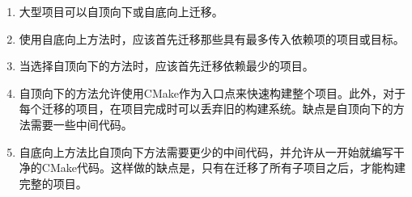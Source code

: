 

\begin{enumerate}
\item 
大型项目可以自顶向下或自底向上迁移。

\item
使用自底向上方法时，应该首先迁移那些具有最多传入依赖项的项目或目标。

\item 
当选择自顶向下的方法时，应该首先迁移依赖最少的项目。

\item 
自顶向下的方法允许使用CMake作为入口点来快速构建整个项目。此外，对于每个迁移的项目，在项目完成时可以丢弃旧的构建系统。缺点是自顶向下的方法需要一些中间代码。

\item 
自底向上方法比自顶向下方法需要更少的中间代码，并允许从一开始就编写干净的CMake代码。这样做的缺点是，只有在迁移了所有子项目之后，才能构建完整的项目。
\end{enumerate}